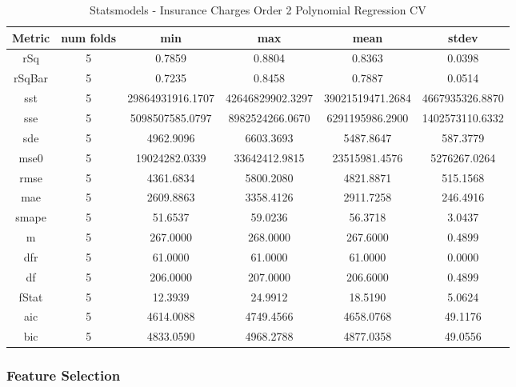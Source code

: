 \documentclass{article}
\begin{document}
\begin{table}[H]
\centering
\caption{Statsmodels - Insurance Charges Order 2 Polynomial Regression CV}
\label{tab:Statsmodels - Insurance Charges Order 2 Polynomial Regression CV}
\begin{tabular}{|c|c|c|c|c|c|}\hline
Metric & num folds & min & max & mean & stdev \\ \hline \hline
rSq & 5 & 0.7859 & 0.8804 & 0.8363 & 0.0398 \\ \hline
rSqBar & 5 & 0.7235 & 0.8458 & 0.7887 & 0.0514 \\ \hline
sst & 5 & 29864931916.1707 & 42646829902.3297 & 39021519471.2684 & 4667935326.8870 \\ \hline
sse & 5 & 5098507585.0797 & 8982524266.0670 & 6291195986.2900 & 1402573110.6332 \\ \hline
sde & 5 & 4962.9096 & 6603.3693 & 5487.8647 & 587.3779 \\ \hline
mse0 & 5 & 19024282.0339 & 33642412.9815 & 23515981.4576 & 5276267.0264 \\ \hline
rmse & 5 & 4361.6834 & 5800.2080 & 4821.8871 & 515.1568 \\ \hline
mae & 5 & 2609.8863 & 3358.4126 & 2911.7258 & 246.4916 \\ \hline
smape & 5 & 51.6537 & 59.0236 & 56.3718 & 3.0437 \\ \hline
m & 5 & 267.0000 & 268.0000 & 267.6000 & 0.4899 \\ \hline
dfr & 5 & 61.0000 & 61.0000 & 61.0000 & 0.0000 \\ \hline
df & 5 & 206.0000 & 207.0000 & 206.6000 & 0.4899 \\ \hline
fStat & 5 & 12.3939 & 24.9912 & 18.5190 & 5.0624 \\ \hline
aic & 5 & 4614.0088 & 4749.4566 & 4658.0768 & 49.1176 \\ \hline
bic & 5 & 4833.0590 & 4968.2788 & 4877.0358 & 49.0556 \\ \hline
\end{tabular}
\end{table}

\subsubsection{Feature Selection}
\end{document}
